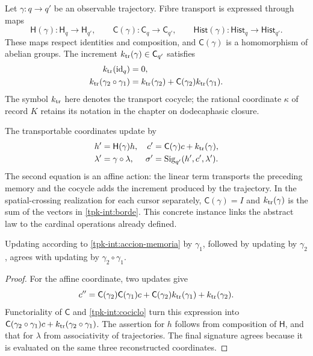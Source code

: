 Let \(\gamma:q\to q'\) be an observable trajectory. Fibre
transport is expressed through maps
\[
 \mathsf H(\gamma):\mathsf H_q\to\mathsf H_{q'},\qquad
 \mathsf C(\gamma):\mathsf C_q\to\mathsf C_{q'},\qquad
 \mathsf{Hist}(\gamma):\mathsf{Hist}_q\to\mathsf{Hist}_{q'}.
\]
These maps respect identities and composition, and
\(\mathsf C(\gamma)\) is a homomorphism of abelian groups.
The increment \(k_{\rm tr}(\gamma)\in\mathsf C_{q'}\) satisfies
\begin{equation}
 \begin{split}
 k_{\rm tr}(\operatorname{id}_q)&=0,\\
 k_{\rm tr}(\gamma_2\circ\gamma_1)
 &=k_{\rm tr}(\gamma_2)+
   \mathsf C(\gamma_2)k_{\rm tr}(\gamma_1).
 \end{split}
 \label{tpk-int:cociclo}
\end{equation}
The symbol \(k_{\rm tr}\) here denotes the transport cocycle;
the rational coordinate \(\kappa\) of record \(K\) retains
its notation in the chapter on dodecaphasic closure.

The transportable coordinates update by
\begin{equation}
 \begin{aligned}
 h'&=\mathsf H(\gamma)h,&
 c'&=\mathsf C(\gamma)c+k_{\rm tr}(\gamma),\\
 \lambda'&=\gamma\circ\lambda,&
 \sigma'&=\operatorname{Sig}_{q'}(h',c',\lambda').
 \end{aligned}
 \label{tpk-int:accion-memoria}
\end{equation}
The second equation is an affine action: the linear term transports
the preceding memory and the cocycle adds the increment produced by the
trajectory. In the spatial-crossing realization for each cursor separately,
\(\mathsf C(\gamma)=I\) and \(k_{\rm tr}(\gamma)\) is the sum
of the vectors in \eqref{tpk-int:borde}. This concrete instance
links the abstract law to the cardinal operations already defined.

\begin{proposition}
\label{tpk-int:composicion-memoria}
Updating according to \eqref{tpk-int:accion-memoria} by
\(\gamma_1\), followed by updating by \(\gamma_2\),
agrees with updating by \(\gamma_2\circ\gamma_1\).
\end{proposition}
\begin{proof}
For the affine coordinate, two updates give
\[
 c''=\mathsf C(\gamma_2)\mathsf C(\gamma_1)c
       +\mathsf C(\gamma_2)k_{\rm tr}(\gamma_1)
       +k_{\rm tr}(\gamma_2).
\]
Functoriality of \(\mathsf C\) and
\eqref{tpk-int:cociclo} turn this expression into
\(\mathsf C(\gamma_2\circ\gamma_1)c+
k_{\rm tr}(\gamma_2\circ\gamma_1)\).
The assertion for \(h\) follows from composition of
\(\mathsf H\), and that for \(\lambda\) from associativity of
trajectories. The final signature agrees because it is evaluated on the same
three reconstructed coordinates.
\end{proof}

